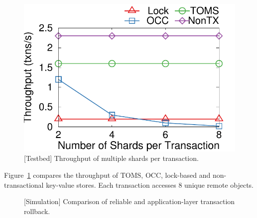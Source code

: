 \begin{figure}[t]
\centering
\includegraphics[width=.35\textwidth]{gnuplot/multishard.pdf}
\caption{[Testbed] Throughput of multiple shards per transaction.}
\label{fig:multishard}
\vspace{-10pt}
\end{figure}

Figure~\ref{fig:multishard} compares the throughput of TOMS, OCC, lock-based and non-transactional key-value stores.
Each transaction accesses 8 unique remote objects.



\begin{figure}[t]
\centering
	\hspace{0.01\textwidth}
\caption{[Simulation] Comparison of reliable \sys and application-layer transaction rollback.}
\label{fig:ycsb-loss}
\end{figure}

